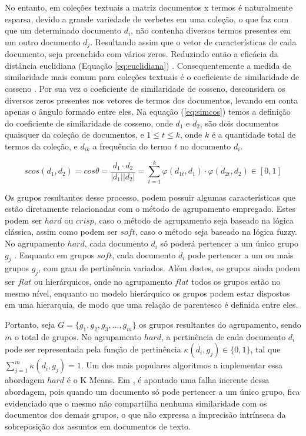 No entanto, em coleções textuais a matriz documentos x termos é naturalmente esparsa, 
devido a grande variedade de 
verbetes em uma coleção, o que faz com que um determinado documento $d_{i}$, não contenha diversos
termos presentes em um outro documento $d_{j}$. Resultando assim que o vetor de características de 
cada documento, seja preenchido com vários zeros. Reduzindo então a eficácia da distância 
euclidiana (Equação \ref{eq:euclidiana})
\cite{Nogueira2013}. Consequentemente a medida de similaridade mais comum para coleções textuais
é o coeficiente de similaridade de cosseno \cite{Nogueira2013}\cite{Feldman2007}. 
Por sua vez o coeficiente
de similaridade de cosseno, desconsidera os diversos zeros presentes nos vetores de termos 
dos documentos, levando em conta apenas o ângulo formado entre eles\cite{Nogueira2013}.
Na equação (\ref{eq:simcos}) temos a definição do coeficiente de similaridade de cosseno, onde 
$d_1$ e $d_2$, são dois documentos quaisquer da coleção de documentos, e $1 \leq t \leq k$, onde 
$k$ é a quantidade total de termos da coleção, e $d_{ik}$ a frequência do termo $t$ no documento $d_i$.

\begin{equation}
  scos(d_{1}, d_{2}) = cos\theta = \frac{d_{1} \cdot d_{2}}{|d_{1}||d_{2}|} = \sum_{t=1}^k{\varphi(d_{1t},d_1) \cdot \varphi(d_{2t},d_2)} \in [0,1]
  \label{eq:simcos}
\end{equation}

Os grupos resultantes desse processo, podem possuir algumas características que estão diretamente
relacionadas com o método de agrupamento empregado. Estes podem ser $hard$ ou $crisp$, caso 
o método de agrupamento seja baseado na lógica clássica, assim como podem ser $soft$, 
caso o método seja baseado na lógica fuzzy. No agrupamento $hard$, cada documento 
$d_{i}$ só poderá pertencer a um único grupo $g_{j}$ \cite{Bezdek1984}. Enquanto em grupos $soft$,
cada documento $d_{i}$ pode pertencer a um ou mais grupos $g_{j}$, com grau de pertinência variados.
Além destes, os grupos ainda podem ser $flat$ ou hierárquicos, onde no agrupamento $flat$
todos os grupos estão no mesmo nível, enquanto no modelo hierárquico os grupos podem estar dispostos
em uma hierarquia, de modo que uma relação de parentesco é definida entre eles.

Portanto, seja $G = \{g_{1},g_{2},g_{3},...,g_{m}\}$ os grupos resultantes do agrupamento, 
sendo $m$ o total de grupos. No agrupamento $hard$, a pertinência de cada 
documento $d_{i}$ pode ser representada pela função de pertinência 
$\kappa(d_{i}, g_{j}) \in \{0,1\}$, tal que $\sum_{j=1}^m \kappa(d_{i}, g_{j}) = 1$. 
Um dos mais populares algoritmos a implementar essa abordagem $hard$ é o K Means.
Em \cite{Bezdek1984}\cite{Nogueira2013}\cite{Feldman2007}, é apontado uma falha inerente dessa
abordagem, pois quando um documento só pode pertencer a um único grupo, fica evidenciado que o mesmo
não compartilha nenhuma similaridade com os documentos dos demais grupos, o que não expressa a
imprecisão intrínseca da sobreposição dos assuntos em documentos de texto.

